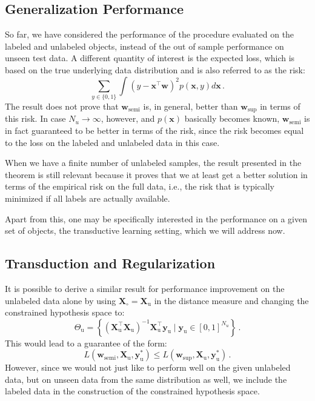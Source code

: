 \documentclass[twoside]{memoir}\usepackage[]{graphicx}\usepackage{xcolor}
\renewcommand{\vec}{\mathbf}
\begin{document}
\subsection{Generalization Performance}
So far, we have considered the performance of the procedure evaluated on the labeled and unlabeled objects, instead of the out of sample performance on unseen test data. A different quantity of interest is the expected loss, which is based on the true underlying data distribution and is also referred to as the risk:
\begin{equation} \label{eq:risk}
\sum_{y \in \{0,1\}} \int (y-\mathbf{x}^\top \mathbf{w})^2 p(\mathbf{x},y) d\mathbf{x} \,. \nonumber
\end{equation}
The result does not prove that $\mathbf{w}_\text{semi}$ is, in general, better than $\mathbf{w}_\text{sup}$ in terms of this risk. In case $N_u \to \infty$, however, and $p(\mathbf{x})$ basically becomes known, $\mathbf{w}_\mathrm{semi}$ is in fact guaranteed to be better in terms of the risk, since the risk becomes equal to the loss on the labeled and unlabeled data in this case.

When we have a finite number of unlabeled samples, the result presented in the theorem is still relevant because it proves that we at least get a better solution in terms of the empirical risk on the full data, i.e., the risk that is typically minimized if all labels are actually available.

Apart from this, one may be specifically interested in the performance on a given set of objects, the transductive learning setting, which we will address now.

\subsection{Transduction and Regularization}
It is possible to derive a similar result for performance improvement on the unlabeled data alone by using $\vec{X}_\circ=\vec{X}_\text{u}$ in the distance measure and changing the constrained hypothesis space to:
\begin{equation}
\label{eq:constrainedregion2}
\Theta_\text{u} = \left\{ (\vec{X}_\mathrm{u}^\top \vec{X}_\mathrm{u})^{-1} \vec{X}_\mathrm{u}^\top \vec{y}_\mathrm{u} \mid \vec{y}_\text{u} \in [0,1]^{N_u} \right\}  \, . \nonumber
\end{equation}
This would lead to a guarantee of the form:
\begin{equation}
L(\vec{w}_\mathrm{semi},\vec{X}_\mathrm{u},\vec{y}_\mathrm{u}^{\ast}) \leq L(\vec{w}_\mathrm{sup},\vec{X}_\mathrm{u},\vec{y}_\mathrm{u}^{\ast})  \, . \nonumber
\end{equation}
However, since we would not just like to perform well on the given unlabeled data, but on unseen data from the same distribution as well, we include the labeled data in the construction of the constrained hypothesis space.
\end{document}
